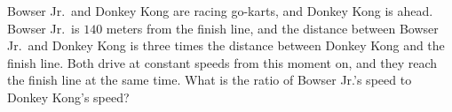 Bowser Jr.\ and Donkey Kong are racing go-karts, and Donkey Kong is ahead. Bowser Jr.\ is $140$ meters from the finish line, and the distance between Bowser Jr.\ and Donkey Kong is three times the distance between Donkey Kong and the finish line. Both drive at constant speeds from this moment on, and they reach the finish line at the same time. What is the ratio of Bowser Jr.'s speed to Donkey Kong's speed?
